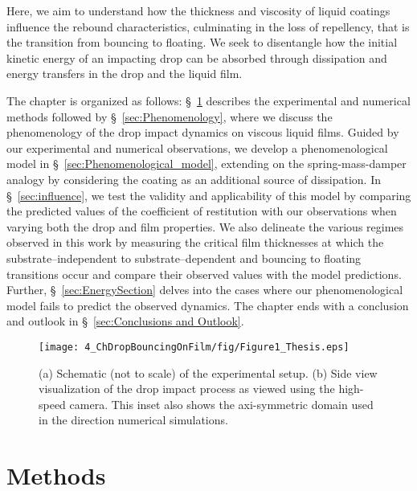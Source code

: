 Here, we aim to understand how the thickness and viscosity of liquid coatings influence the rebound characteristics, culminating in the loss of repellency, that is the transition from bouncing to floating. 
We seek to disentangle how the initial kinetic energy of an impacting drop can be absorbed through dissipation and energy transfers in the drop and the liquid film. 

The chapter is organized as follows: \S~\ref{sec:Methods} describes the experimental and numerical methods followed by \S~\ref{sec:Phenomenology}, where we discuss the phenomenology of the drop impact dynamics on viscous liquid films. 
Guided by our experimental and numerical observations, we develop a phenomenological model in \S~\ref{sec:Phenomenological_model}, extending on the spring-mass-damper analogy by considering the coating as an additional source of dissipation. In \S~\ref{sec:influence}, we test the validity and applicability of this model by comparing the predicted values of the coefficient of restitution with our observations when varying both the drop and film properties. 
We also delineate the various regimes observed in this work by measuring the critical film thicknesses at which the substrate--independent to substrate--dependent and bouncing to floating transitions occur and compare their observed values with the model predictions. Further, \S~\ref{sec:EnergySection} delves into the cases where our phenomenological model fails to predict the observed dynamics. The chapter ends with a conclusion and outlook in \S~\ref{sec:Conclusions and Outlook}.

\begin{figure}
	\centering
	\texttt{[image: 4\_ChDropBouncingOnFilm/fig/Figure1\_Thesis.eps]}
	\caption{(a) Schematic (not to scale) of the experimental setup. (b) Side view visualization of the drop impact process as viewed using the high-speed camera. This inset also shows the axi-symmetric domain used in the direction numerical simulations.}
	\label{fig:schematic}
\end{figure}

\section{Methods}
\label{sec:Methods} %
